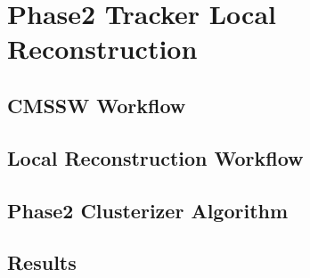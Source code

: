 \chapter{Phase2 Tracker Local Reconstruction}
\label{chap:phase2_tracker}

    \section{CMSSW Workflow}
    \section{Local Reconstruction Workflow}
    \section{Phase2 Clusterizer Algorithm}
    \section{Results}
